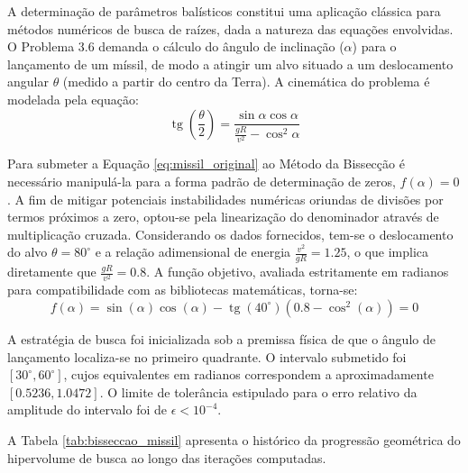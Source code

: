 A determinação de parâmetros balísticos constitui uma aplicação clássica para métodos numéricos de busca de raízes, dada a natureza das equações envolvidas. O Problema 3.6 demanda o cálculo do ângulo de inclinação ($\alpha$) para o lançamento de um míssil, de modo a atingir um alvo situado a um deslocamento angular $\theta$ (medido a partir do centro da Terra). A cinemática do problema é modelada pela equação:
\begin{equation}
    \operatorname{tg}\left(\frac{\theta}{2}\right) = \frac{\sin \alpha \cos \alpha}{\frac{g R}{v^2} - \cos^2 \alpha}
    \label{eq:missil_original}
\end{equation}

Para submeter a Equação \ref{eq:missil_original} ao Método da Bissecção é necessário manipulá-la para a forma padrão de determinação de zeros, $f(\alpha) = 0$. A fim de mitigar potenciais instabilidades numéricas oriundas de divisões por termos próximos a zero, optou-se pela linearização do denominador através de multiplicação cruzada. Considerando os dados fornecidos, tem-se o deslocamento do alvo $\theta = 80^\circ$ e a relação adimensional de energia $\frac{v^2}{gR} = 1.25$, o que implica diretamente que $\frac{gR}{v^2} = 0.8$. A função objetivo, avaliada estritamente em radianos para compatibilidade com as bibliotecas matemáticas, torna-se:
\begin{equation}
    f(\alpha) = \sin(\alpha)\cos(\alpha) - \operatorname{tg}\left(40^\circ\right)\left(0.8 - \cos^2(\alpha)\right) = 0
    \label{eq:missil_funcao_bisseccao}
\end{equation}

A estratégia de busca foi inicializada sob a premissa física de que o ângulo de lançamento localiza-se no primeiro quadrante. O intervalo submetido foi $[30^\circ, 60^\circ]$, cujos equivalentes em radianos correspondem a aproximadamente $[0.5236, 1.0472]$. O limite de tolerância estipulado para o erro relativo da amplitude do intervalo foi de $\epsilon < 10^{-4}$.

A Tabela \ref{tab:bisseccao_missil} apresenta o histórico da progressão geométrica do hipervolume de busca ao longo das iterações computadas.

